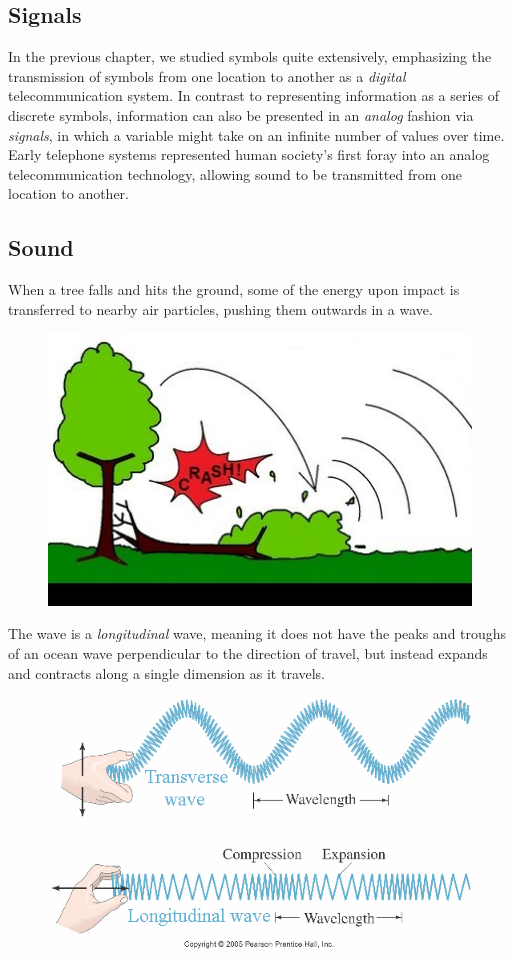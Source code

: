 \documentclass[UTF8]{book}
\begin{document}
\begin{CJK}{UTF8}{gbsn}
\chapter{Signals}

In the previous chapter, we studied symbols quite extensively, emphasizing the transmission of symbols from one location to another as a \emph{digital} telecommunication system. In contrast to representing information as a series of discrete symbols, information can also be presented in an \emph{analog} fashion via \emph{signals}, in which a variable might take on an infinite number of values over time. Early telephone systems represented human society's first foray into an analog telecommunication technology, allowing sound to be transmitted from one location to another.

\section{Sound}

When a tree falls and hits the ground, some of the energy upon impact is transferred to nearby air particles, pushing them outwards in a wave.

\begin{figure}[H]
\centering
\includegraphics[width=0.8\linewidth]{treefalling_edited}
\end{figure}

The wave is a \emph{longitudinal} wave, meaning it does not have the peaks and troughs of an ocean wave perpendicular to the direction of travel, but instead expands and contracts along a single dimension as it travels.

\begin{figure}[H]
\centering
\includegraphics[width=0.8\linewidth]{longvstransvwave}
\end{figure}


\end{CJK}
\end{document}
